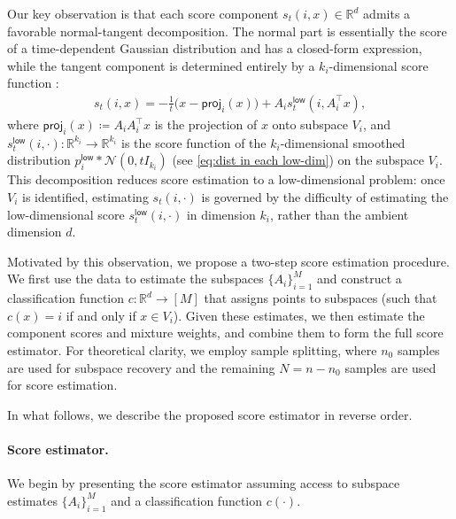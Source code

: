 \documentclass{article}
\newcommand{\defn}{\coloneqq}
\newcommand{\cN}{\mathcal{N}}
\newcommand{\bR}{\mathbb{R}}
\newcommand{\proj}{\mathsf{proj}}
\newcommand{\low}{\mathsf{low}}
\theoremstyle{plain}
\theoremstyle{remark}
\begin{document}
Our key observation is that each score component $s_t(i,x) \in \bR^d$ admits a favorable normal-tangent decomposition. 
The normal part is essentially the score of a time-dependent Gaussian distribution and has a closed-form expression, while the tangent component is determined entirely by a $k_i$-dimensional score function \citep{chen2023scoreapproximationestimationdistribution}:
\begin{align}
    s_t(i,x) = -\frac{1}{t}\big(x-\proj_i(x)\big) + A_i s_t^\low(i,A_i^{\top}x), \label{eq:s_t(i,x) decomp}
\end{align}
where $\proj_i(x)\defn  A_i A_i^{\top} x$ is the projection of $x$ onto subspace $V_i$, and $s_t^\low(i,\cdot):\mathbb{R}^{k_i}\rightarrow \mathbb{R}^{k_i}$ is the score function of the $k_i$-dimensional smoothed distribution $p^\low_i \ast \cN(0,tI_{k_i})$ (see \eqref{eq:dist in each low-dim}) on the subspace $V_i$.
This decomposition reduces score estimation to a low-dimensional problem: once $V_i$ is identified, estimating $s_t(i,\cdot)$ is governed by the difficulty of estimating the low-dimensional score $s_t^\low(i,\cdot)$ in dimension $k_i$, rather than the ambient dimension $d$.


Motivated by this observation, we propose a two-step score estimation procedure.
We first use the data to estimate the subspaces $\{A_i\}_{i=1}^M$ and construct a classification function $c:\mathbb{R}^d\to[M]$ that assigns points to subspaces (such that $c(x)=i$ if and only if $x\in V_i$).
Given these estimates, we then estimate the component scores and mixture weights, and combine them to form the full score estimator.
For theoretical clarity, we employ sample splitting, where $n_0$ samples are used for subspace recovery and the remaining $N = n-n_0$ samples are used for score estimation.

In what follows, we describe the proposed score estimator in reverse order.

\paragraph{Score estimator.}

We begin by presenting the score estimator assuming access to subspace estimates $\{A_i\}_{i=1}^M$
and a classification function $c(\cdot)$.
\end{document}
